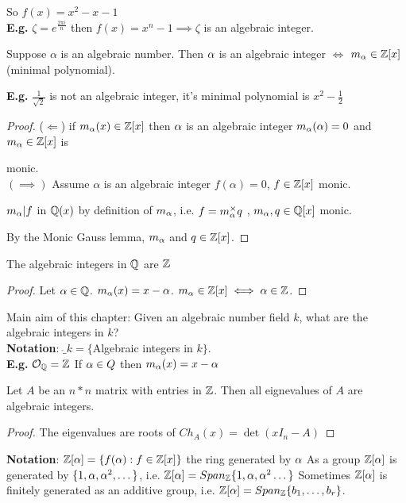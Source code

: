 \documentclass[11pt]{article}
\begin{document}
So $f(x) = x^2 - x-1$
$ $\\[1em]
\textbf{E.g.} $\zeta = e^{\frac{2\pi i}{n}}$ then $f(x) = x^n - 1 \implies \zeta$ is an algebraic integer.

\begin{prop}
	Suppose $\alpha$ is an algebraic number. 
	Then $\alpha$ is an algebraic integer $\iff$ $m_\alpha \in \mathbb{Z}[x] $ (minimal polynomial).
\end{prop}
$ $\\[-0.5em] 
\textbf{E.g.} $\frac{1}{\sqrt{2}}$ is not an algebraic integer, it's minimal polynomial is $x^2 - \frac{1}{2}$

\begin{proof}
	($\Longleftarrow$) if $m_\alpha(x) \in \mathbb{Z}[x] $ then $\alpha$ is an algebraic integer $m_\alpha(\alpha) = 0$ and $m_\alpha \in \mathbb{Z}[x]$ is
	
	monic.
$ $\\
	$(\implies)$ Assume $\alpha$ is an algebraic integer $f(\alpha) = 0 $, $f \in \mathbb{Z}[x]$ monic.

	$m_\alpha  | f $ in $\mathbb{Q}(x) $ by definition of $m_\alpha$, i.e. $f = m_\alpha^\times q$ , $m_\alpha, q \in \mathbb{Q}[x] $ monic.

	By the Monic Gauss lemma, $m_\alpha$ and $q \in \mathbb{Z}[x]$. 
\end{proof}

\begin{cor}
The algebraic integers in $\mathbb{Q}$ are $\mathbb{Z}$
\end{cor}
\begin{proof}
Let $\alpha \in \mathbb{Q} $.
	$m_\alpha(x) = x-\alpha $.
	$m_\alpha \in \mathbb{Z}[x] \iff \alpha \in \mathbb{Z}$.
\end{proof}
$ $\\[-0.5em]
Main aim of this chapter: Given an algebraic number field $k$, what are the algebraic integers in $k$?
$ $\\[1em]
\textbf{Notation}: $\ring_k = \{ $Algebraic integers in $k\}$.\\
\spa
\textbf{E.g.} $\mathcal{O}_{\mathbb{Q}} = \mathbb{Z}$ If $\alpha \in Q$ then $m_\alpha(x) = x-\alpha$



\begin{prop}
Let $A$ be an $n * n$ matrix with entries in $\mathbb{Z}$.
Then all eignevalues of $A$ are algebraic integers.
\end{prop}
\begin{proof}
	The eigenvalues are roots of $Ch_A(x) = \det(xI_n-A)$
\end{proof}
\spa
\textbf{Notation}:
$ \mathbb{Z} [ \alpha ] = \{f(\alpha) : f \in \mathbb{Z}[x] \}$ the ring generated by $\alpha$
\spac
As a group $\mathbb{Z}[\alpha]$ is generated by $\{1,\alpha,\alpha^2 , \dots \}$, i.e. $\mathbb{Z}[\alpha] = Span_{\mathbb{Z}}\{1,\alpha,\alpha^2 \dots \}$
\spac
Sometimes $\mathbb{Z}[\alpha]$ is finitely generated as an additive group, i.e. $\mathbb{Z}[\alpha] = Span_{\mathbb{Z}}\{b_1, \dots, b_r\}$.
\end{document}
